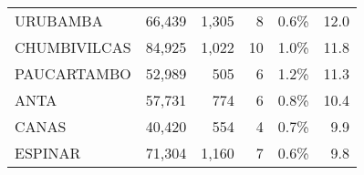 \begin{tabular}{lrrrrr}
	\cellcolor[HTML]{FFFFC7}URUBAMBA      & 66,439                                                         & 1,305                                                                           & 8                                                              & 0.6\%                                                                  & 12.0                                                                                                                               \\
	\cellcolor[HTML]{FFFFC7}CHUMBIVILCAS  & 84,925                                                         & 1,022                                                                           & 10                                                             & 1.0\%                                                                  & 11.8                                                                                                                               \\
	\cellcolor[HTML]{FFFFC7}PAUCARTAMBO   & 52,989                                                         & 505                                                                             & 6                                                              & 1.2\%                                                                  & 11.3                                                                                                                               \\
	\cellcolor[HTML]{FFFFC7}ANTA          & 57,731                                                         & 774                                                                             & 6                                                              & 0.8\%                                                                  & 10.4                                                                                                                               \\
	\cellcolor[HTML]{FFFFC7}CANAS         & 40,420                                                         & 554                                                                             & 4                                                              & 0.7\%                                                                  & 9.9                                                                                                                                \\
	\cellcolor[HTML]{FFFFC7}ESPINAR       & 71,304                                                         & 1,160                                                                           & 7                                                              & 0.6\%                                                                  & 9.8                                                                                                                                \\

\end{tabular}
